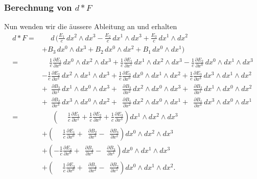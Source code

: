 \subsubsection{Berechnung von $d {\ast} F$}
Nun wenden wir die äussere Ableitung an und erhalten
\begin{align*}
	d{\ast} F
	= &\phantom{+} d \, \Bigg(
	\frac{E_{1}}{c} \, dx^2 \wedge dx^3
	- \frac{E_{2}}{c} \, dx^1 \wedge dx^3
	+ \frac{E_{3}}{c} \, dx^1 \wedge dx^2 
	\\
	&+ B_3 \, dx^0 \wedge dx^3
	+ B_2 \, dx^0 \wedge dx^2
	+ B_1 \, dx^0 \wedge dx^1
	\Bigg) \\[1ex]
	= &\quad \frac{1}{c} \frac{\partial E_1}{\partial x^0} \, dx^0 \wedge dx^2 \wedge dx^3
	+ \frac{1}{c} \frac{\partial E_1}{\partial x^1} \, dx^1 \wedge dx^2 \wedge dx^3
	- \frac{1}{c} \frac{\partial E_2}{\partial x^0} \, dx^0 \wedge dx^1 \wedge dx^3 
	\\
	&- \frac{1}{c} \frac{\partial E_2}{\partial x^2} \, dx^2 \wedge dx^1 \wedge dx^3
	+ \frac{1}{c} \frac{\partial E_3}{\partial x^0} \, dx^0 \wedge dx^1 \wedge dx^2
	+ \frac{1}{c} \frac{\partial E_3}{\partial x^3} \, dx^3 \wedge dx^1 \wedge dx^2 
	\\
	&+\phantom{\frac{1}{c}} \frac{\partial B_3}{\partial x^1} \, dx^1 \wedge dx^0 \wedge dx^3
	+ \phantom{\frac{1}{c}} \frac{\partial B_3}{\partial x^2} \, dx^2 \wedge dx^0 \wedge dx^3
	+ \phantom{\frac{1}{c}} \frac{\partial B_2}{\partial x^1} \, dx^1 \wedge dx^0 \wedge dx^2 \\
	&+\phantom{\frac{1}{c}} \frac{\partial B_2}{\partial x^3} \, dx^3 \wedge dx^0 \wedge dx^2
	+ \phantom{\frac{1}{c}} \frac{\partial B_1}{\partial x^2} \, dx^2 \wedge dx^0 \wedge dx^1
	+ \phantom{\frac{1}{c}} \frac{\partial B_1}{\partial x^3} \, dx^3 \wedge dx^0 \wedge dx^1 
	\\[2ex]
	= &\phantom{+} \: \left(
	\phantom{+} \frac{1}{c} \frac{\partial E_1}{\partial x^1}
	+ \frac{1}{c} \frac{\partial E_2}{\partial x^2}
	+ \frac{1}{c} \frac{\partial E_3}{\partial x^3}
	\right) dx^1 \wedge dx^2 \wedge dx^3 
	\\
	&+ \left(
	\phantom{+} \frac{1}{c} \frac{\partial E_1}{\partial x^0}
	+ \phantom{\frac{1}{c}} \frac{\partial B_2}{\partial x^3}
	- \phantom{\frac{1}{c}} \frac{\partial B_3}{\partial x^2}
	\right) dx^0 \wedge dx^2 \wedge dx^3 
	\\
	&+ \left(
	-\frac{1}{c} \frac{\partial E_2}{\partial x^0}
	+ \phantom{\frac{1}{c}} \frac{\partial B_1}{\partial x^3}
	- \phantom{\frac{1}{c}} \frac{\partial B_3}{\partial x^1}
	\right) dx^0 \wedge dx^1 \wedge dx^3 
	\\
	&+ \left(
	\phantom{+} \frac{1}{c} \frac{\partial E_3}{\partial x^0}
	+ \phantom{\frac{1}{c}} \frac{\partial B_1}{\partial x^2}
	- \phantom{\frac{1}{c}} \frac{\partial B_2}{\partial x^1}
	\right) dx^0 \wedge dx^1 \wedge dx^2.
\end{align*}


